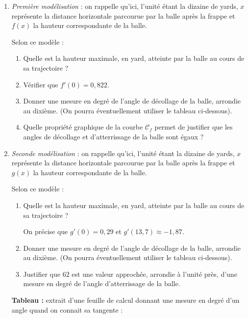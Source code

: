 \documentclass[10pt]{article}
\begin{document}
\begin{enumerate}
\item \emph{Première modélisation} : on rappelle qu'ici, l'unité étant la dizaine de yards, $x$ représente la distance horizontale parcourue par la balle après la frappe et $f(x)$ la hauteur correspondante de la balle.

Selon ce modèle :
	\begin{enumerate}
		\item Quelle est la hauteur maximale, en yard, atteinte par la balle au cours de sa trajectoire ?
		\item Vérifier que $f'(0) = 0,822$.
		\item Donner une mesure en degré de l'angle de décollage de la balle, arrondie au dixième. (On pourra éventuellement utiliser le tableau ci-dessous).
		\item Quelle propriété graphique de la courbe $\mathcal{C}_f$ permet de justifier que les angles de décollage et d'atterrissage de la balle sont égaux ?
	\end{enumerate}
\item \emph{Seconde modélisation } : on rappelle qu'ici, l'unité étant la dizaine de yards, $x$ représente la distance horizontale parcourue par la balle après la frappe et $g(x)$ la hauteur correspondante de la balle.

Selon ce modèle :

	\begin{enumerate}
		\item Quelle est la hauteur maximale, en yard, atteinte par la balle au cours de sa trajectoire ?

On précise que $g'(0) = 0,29$ et $g'(13,7) \approx -1,87$.
		\item Donner une mesure en degré de l'angle de décollage de la balle, arrondie au dixième. (On pourra éventuellement utiliser le tableau ci-dessous).
		\item Justifier que $62$ est une valeur approchée, arrondie à l'unité près, d'une mesure en degré de l'angle d'atterrissage de la balle.
	\end{enumerate}
\medskip

\textbf{Tableau :} extrait d'une feuille de calcul donnant une mesure en degré d'un angle quand on connait sa tangente :


\end{enumerate}
\end{document}

